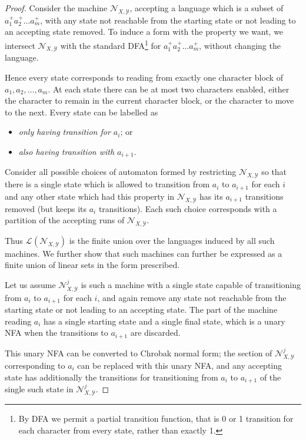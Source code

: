 \documentclass[10pt,a4paper]{amsart}
\numberwithin{equation}{section}
\theoremstyle{plain}
\theoremstyle{definition}
\theoremstyle{remark}
\newcommand\lng[2]{\mathcal{L}_{#1}(#2)}
\newcommand\chr{a}
\begin{document}
\begin{proof}
Consider the machine $\mathcal{N}_{X,\mathcal{Y}}$, accepting a language which is a subset of $\chr_1^+\chr_2^+\dots \chr_m^+$, with any state not reachable from the starting state or not leading to an accepting state removed. To induce a form with the property we want, we intersect $\mathcal{N}_{X,\mathcal{Y}}$ with the standard DFA\footnote{By DFA we permit a partial transition function, that is 0 or 1 transition for each character from every state, rather than exactly 1.} for $\chr_1^+\chr_2^+\dots \chr_m^+$, without changing the language.

Hence every state corresponds to reading from exactly one character block of $\chr_1,\chr_2,\dots,\chr_m$. At each state there can be at most two characters enabled, either the character to remain in the current character block, or the character to move to the next. Every state can be labelled as \begin{itemize} \item  \textit{only having transition for $\chr_{i}$}; or \item \textit{also having transition with $\chr_{i+1}$}.\end{itemize} Consider all possible choices of automaton formed by restricting $\mathcal{N}_{X,\mathcal{Y}}$ so that there is a single state which is allowed to transition from $\chr_{i}$ to $\chr_{i+1}$ for each $i$ and any other state which had this property in $\mathcal{N}_{X,\mathcal{Y}}$ has its $\chr_{i+1}$ transitions removed (but keeps its $\chr_i$ transitions). Each such choice corresponds with a partition of the accepting runs of $\mathcal{N}_{X,\mathcal{Y}}$.

Thus $\lng{}{\mathcal{N}_{X,\mathcal{Y}}}$ is the finite union over the languages induced by all such machines. We further show that such machines can further be expressed as a finite union of  linear sets in the form prescribed.

Let us assume $\mathcal{N}_{X,\mathcal{Y}}^j$ is such a machine with a single state capable of transitioning from $\chr_{i}$ to $\chr_{i+1}$ for each $i$, and again remove any state not reachable from the starting state or not leading to an accepting state. The part of the machine reading $a_i$ has a single starting state and a single final state, which is a unary NFA when the transitions to $\chr_{i+1}$ are discarded.

This unary NFA can be converted to Chrobak normal form; the section of  $\mathcal{N}_{X,\mathcal{Y}}^j$ corresponding to $a_i$ can be replaced with this unary NFA, and any accepting state has additionally the transitions for transitioning from $\chr_{i}$ to $\chr_{i+1}$ of the single such state in $\mathcal{N}_{X,\mathcal{Y}}^j$.


\end{proof}
\end{document}
